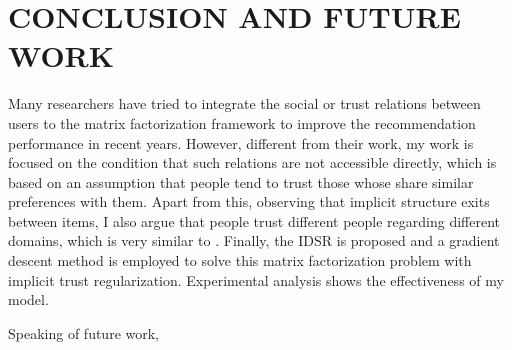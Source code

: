 \section{CONCLUSION AND FUTURE WORK}
Many researchers have tried to integrate the social or trust relations between users to the matrix factorization framework to improve the recommendation performance in recent years. However, different from their work, my work is focused on the condition that such relations are not accessible directly, which is based on an assumption that people tend to trust those whose share similar preferences with them. Apart from this, observing that implicit structure exits between items, I also argue that people trust different people regarding different domains, which is very similar to \cite{yang2012circle}. Finally, the IDSR is proposed and a gradient descent method is employed to solve this matrix factorization problem with implicit trust regularization. Experimental analysis shows the effectiveness of my model.

Speaking of future work, 